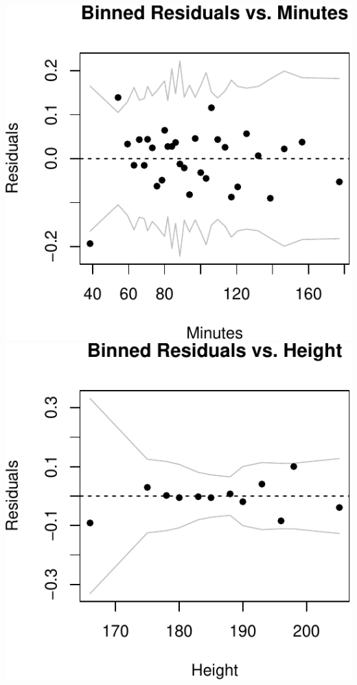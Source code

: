 \documentclass[]{article}
\begin{document}
\includegraphics{Project_files/figure-latex/unnamed-chunk-23-1.pdf}
\includegraphics{Project_files/figure-latex/unnamed-chunk-23-2.pdf}
\end{document}
